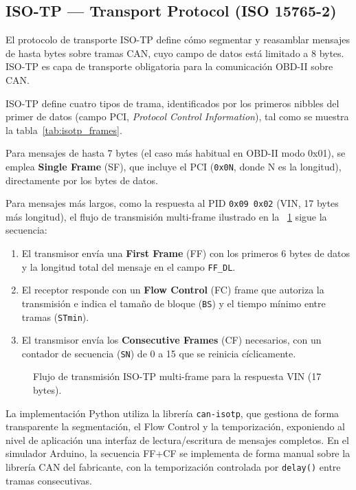 \subsection{ISO-TP — Transport Protocol (ISO 15765-2)}
\label{sec:proto_isotp}

El protocolo de transporte ISO-TP define cómo segmentar y reasamblar mensajes de hasta  bytes sobre tramas CAN, cuyo campo de datos está limitado a 8 bytes. ISO-TP es  capa de transporte obligatoria para la comunicación OBD-II sobre CAN.

ISO-TP define cuatro tipos de trama, identificados por los primeros nibbles del primer  de datos (campo PCI, \textit{Protocol Control Information}), tal como se muestra  la tabla~\ref{tab:isotp_frames}.

% 

Para mensajes de hasta 7 bytes (el caso más habitual en OBD-II modo 0x01), se emplea  \textbf{Single Frame} (SF), que incluye el PCI (\texttt{0x0N}, donde N es la longitud),  directamente por los bytes de datos.

Para mensajes más largos, como la respuesta al PID \texttt{0x09 0x02} (VIN, 17 bytes más  longitud), el flujo de transmisión multi-frame ilustrado en la ~\ref{fig:isotp_multiframe} sigue la secuencia:

\begin{enumerate}
    \item El transmisor envía una \textbf{First Frame} (FF) con los primeros 6 bytes de datos y la longitud total del mensaje en el campo \texttt{FF\_DL}. \item El receptor responde con un \textbf{Flow Control} (FC) frame que autoriza la transmisión e indica el tamaño de bloque (\texttt{BS}) y el tiempo mínimo entre tramas (\texttt{STmin}).
    \item El transmisor envía los \textbf{Consecutive Frames} (CF) necesarios, con un contador de secuencia (\texttt{SN}) de 0 a 15 que se reinicia cíclicamente.
\end{enumerate}

\begin{figure}[!htbp]
\centering
\caption{Flujo de transmisión ISO-TP multi-frame para la respuesta VIN (17 bytes).}
\label{fig:isotp_multiframe}
\end{figure}

La implementación Python utiliza la librería \texttt{can-isotp}, que gestiona de forma transparente la segmentación, el Flow Control y la temporización, exponiendo al nivel de aplicación una interfaz de lectura/escritura de mensajes completos. En el simulador Arduino, la secuencia FF+CF se implementa de forma manual sobre la librería CAN del fabricante, con la temporización controlada por \texttt{delay()} entre tramas consecutivas.


